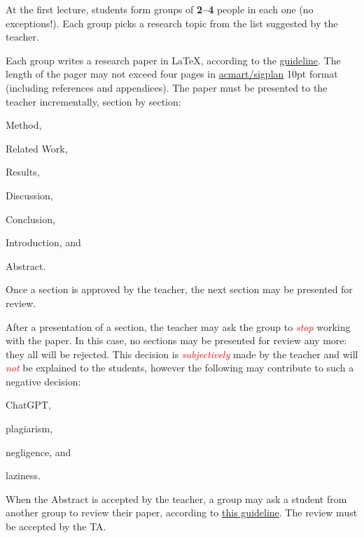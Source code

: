 \documentclass[nobrand,anonymous,nodate,nosecurity]{huawei}
\begin{document}
{At the first lecture, students form groups of \textbf{2--4} people in each one (no exceptions!).
Each group picks a research topic from the list suggested by the teacher.

Each group writes a research paper in \LaTeX, according
to the \href{https://www.yegor256.com/2022/08/24/research-paper-template.html}{guideline}.
The length of the pager may not exceed four pages in
\href{https://ctan.org/pkg/acmart}{acmart/sigplan} 10pt format
(including references and appendices).
The paper must be presented to the teacher incrementally, section by section:
\begin{inparaenum}[1)]
\item Method,
\item Related Work,
\item Results,
\item Discussion,
\item Conclusion,
\item Introduction,
and
\item Abstract.
\end{inparaenum}
Once a section is approved by the teacher, the next section may be presented for review.

\newcommand\angry[1]{\textcolor{red}{\emph{#1}}}
After a presentation of a section, the teacher may ask the group to \angry{stop}
working with the paper. In this case, no sections may be presented for review any more: they all will be rejected.
This decision is \angry{subjectively} made by the teacher and will \angry{not} be explained
to the students, however the following may contribute to such a
negative decision:
\begin{inparaenum}[a)]
    \item ChatGPT,
    \item plagiarism,
    \item negligence,
    and
    \item laziness.
\end{inparaenum}

When the Abstract is accepted by the teacher, a group may ask a student from another
group to review their paper, according to
\href{https://www.yegor256.com/2023/12/17/how-to-review-research-paper.html}{this guideline}.
The review must be accepted by the TA.

}
\end{document}
